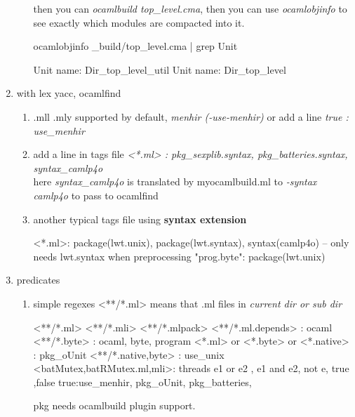 \begin{enumerate}
\begin{enumerate}
then you can \textit{ocamlbuild top\_level.cma}, then you can use
\textit{ocamlobjinfo} to see exactly which modules are compacted into
it.

\begin{redcode}
ocamlobjinfo _build/top_level.cma | grep Unit  
\end{redcode}

\begin{bluecode}
Unit name: Dir_top_level_util
Unit name: Dir_top_level
\end{bluecode}


\end{enumerate}

\item with lex yacc, ocamlfind 

\begin{enumerate}
\item .mll .mly supported by default, \textit{menhir (-use-menhir)} or add a line
  \textit{true : use\_menhir}

\item add a line in tags file 
  \textit{<*.ml> : pkg\_sexplib.syntax, pkg\_batteries.syntax, syntax\_camlp4o} \\
  here \textit{syntax\_camlp4o} is translated by myocamlbuild.ml to \emph{-syntax camlp4o} to pass to ocamlfind

\item another typical tags file using \textbf{ syntax extension}
  

\begin{bluetext}
<*.ml>: package(lwt.unix), package(lwt.syntax), syntax(camlp4o) -- only needs lwt.syntax when preprocessing
"prog.byte": package(lwt.unix)
\end{bluetext}

  
\end{enumerate}

\item predicates
  
\begin{enumerate}
\item simple regexes 
  <**/*.ml>    means that .ml files in \emph{current dir or sub dir}

\begin{bluetext}
  <**/*.ml> <**/*.mli> <**/*.mlpack> <**/*.ml.depends> : ocaml 
  <**/*.byte> : ocaml, byte, program 
  <*.ml> or <*.byte> or <*.native> : pkg_oUnit 
  <**/*.{native,byte}> : use_unix 
  <{batMutex,batRMutex}.{ml,mli}>: threads 
  e1 or e2 , e1 and e2, not e, true ,false 
  true:use_menhir, pkg_oUnit, pkg_batteries,
\end{bluetext}
pkg needs ocamlbuild plugin support.


\end{enumerate}
\end{enumerate}
